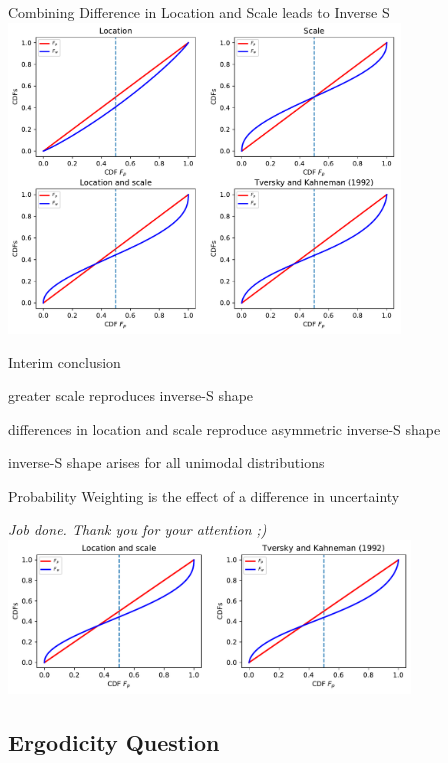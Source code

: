 \begin{frame}{Combining Difference in Location and Scale leads to Inverse S}
\centering
	\includegraphics[width=0.78\textwidth]{img/Gauss_scale_location_both_KT.pdf}
	\label{LocationScale}
\end{frame}

\begin{frame}{Interim conclusion}
\bi
	\item greater scale reproduces inverse-S shape
	\item differences in location and scale reproduce asymmetric inverse-S shape
	\item inverse-S shape arises for all unimodal distributions
	\item Probability Weighting is the effect of a difference in uncertainty
	\item[]
	\item[] \textit{Job done. Thank you for your attention ;)}
	\hfill
	\hyperlink{FunctionalForms}{}
	\label{InterimConclusion}
\ei
	\vspace{2em}
	\centering
	\includegraphics[width=0.8\textwidth]{img/Our_result_and_KT.pdf}
\end{frame}

\subsection{Ergodicity Question}


